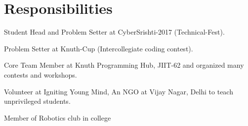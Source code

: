 \documentclass[]{hieudo-build}
\begin{document}
\begin{minipage}[t]{0.69\textwidth}
\section{Responsibilities}

\vspace{0.5em} %
\begin{tightemize}
\item 	Student Head and Problem Setter at CyberSrishti-2017 (Technical-Fest).
\item Problem Setter at Knuth-Cup (Intercollegiate coding contest).
\item Core Team Member at Knuth Programming Hub, JIIT-62 and organized many contests and workshops.
\item Volunteer at Igniting Young Mind, An NGO at Vijay Nagar, Delhi to teach unprivileged students.
\item 	Member of Robotics club in college
\end{tightemize}
\sectionsep



\end{minipage} 
\end{document}
